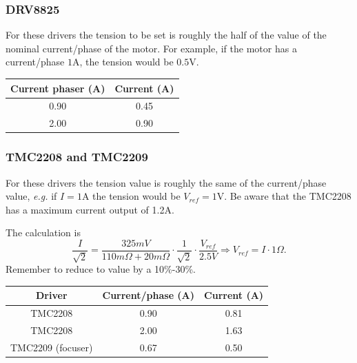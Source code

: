 \documentclass{article}
\begin{document}
\begin{multicols}{2}
        \subsubsection{DRV8825}
        For these drivers the tension to be set is roughly the half of the value of the nominal current/phase of the motor.
        For example, if the motor has a current/phase \(1\)A, the tension would be \(0.5\)V.

        \begin{minipage}
            {.4\textwidth}
            \begin{tabular}{cc}
                Current phaser (A) & Current (A) \\
                \hline
                0.90 & 0.45 \\
                2.00 & 0.90             
            \end{tabular}
            \label{tab:drivers_curr}
        \end{minipage} 

        \subsubsection{TMC2208 and TMC2209}
        For these drivers the tension value is roughly the same of the current/phase value, \textit{e.g.} if \(I=1\)A the tension would be \(V_{ref}=1\)V.
        Be aware that the TMC2208 has a maximum current output of 1.2A.

        The calculation is 
        \[\frac{I}{\sqrt{2}}=\frac{325mV}{110m\Omega+20m\Omega}\cdot\frac{1}{\sqrt{2}}\cdot\frac{V_{ref}}{2.5V}\Rightarrow V_{ref} = I \cdot 1\Omega.\]
        Remember to reduce to value by a 10\%-30\%.

        \begin{minipage}
            {.4\textwidth}
            \begin{tabular}{ccc}
               Driver & Current/phase (A) & Current (A) \\
                \hline
               TMC2208 & 0.90 & 0.81 \\
               TMC2208 &  2.00 & 1.63 \\                
               TMC2209 (focuser) &  0.67 & 0.50                
            \end{tabular}
            \label{tab:drivers_curr}
        \end{minipage} 




\end{multicols}
\end{document}

